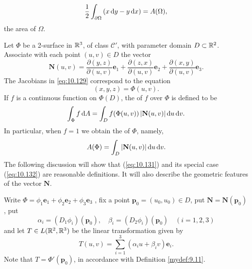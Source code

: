\begin{equation}
    \label{eq:10.128}
    \frac{1}{2} \int_{\partial \Omega}
    \left( x \d y - y \d x \right) = 
    A(\Omega) ,
\end{equation}
the area of $\Omega$.

\begin{mydef}
    \label{mydef:10.46}
    Let $\Phi$ be a 2-surface in ${\protect\mathbb R}^3$, of class $\mathscr{C}'$, 
    with parameter domain $D \subset {\protect\mathbb R}^2$. 
    Associate with each point $(u, v) \in D$ the vector
    \begin{equation}
        \label{eq:10.129}
        \mathbf{N}(u,v) = 
        \frac{\partial (y,z)}{\partial (u,v)} \mathbf{e}_1 + 
        \frac{\partial (z,x)}{\partial (u,v)} \mathbf{e}_2 + 
        \frac{\partial (x,y)}{\partial (u,v)} \mathbf{e}_3 .
    \end{equation}
    The Jacobians in \eqref{eq:10.129} correspond to the equation
    \begin{equation}
        \label{eq:10.130}
        (x,y,z) = \Phi(u,v).
    \end{equation}
    If $f$ is a continuous function on $\Phi(D)$, 
    the  of $f$ over $\Phi$ is defined to be
    \begin{equation}
        \label{eq:10.131}
        \int_{\Phi} f \d A = 
        \int_D f(\Phi(u,v)) \left| \mathbf{N}(u,v) \right| \d u \d v.
    \end{equation}
    In particular, when $f= 1$ we obtain the  of $\Phi$, namely,
    \begin{equation}
        \label{eq:10.132}
        A(\Phi) = \int_{D} \left| \mathbf{N}(u,v) \right| \d u \d v. 
    \end{equation}
    The following discussion will show that (\eqref{eq:10.131}) and its special case (\eqref{eq:10.132}) are reasonable definitions. 
    It will also describe the geometric features of the vector $\mathbf{N}$.

    Write $\Phi = 
    \phi_1 \mathbf{e}_1 + 
    \phi_2 \mathbf{e}_2 + 
    \phi_3 \mathbf{e}_3 $ ,
    fix a point $\mathbf{p}_0 = (u_0,u_0) \in D$, 
    put $\mathbf{N} = \mathbf{N}(\mathbf{p}_0)$, put 
    \begin{equation}
        \label{eq:10.133}
        \alpha_i = (D_1 \phi_i)(\mathbf{p}_0), \quad 
        \beta_i  = (D_2 \phi_i)(\mathbf{p}_0)  \quad 
        (i = 1,2,3)
    \end{equation}
    and let $T \in L({\protect\mathbb R}^2, {\protect\mathbb R}^3)$ be the linear transformation given by
    \begin{equation}
        \label{eq:10.134}
        T(u,v) = \sum_{i=1}^{3}\left( \alpha_i u + \beta_i v \right)\mathbf{e}_i .
    \end{equation}
    Note that $T = \Phi'(\mathbf{p}_0)$, in accordance with Definition \ref{mydef:9.11}.


\end{mydef}
